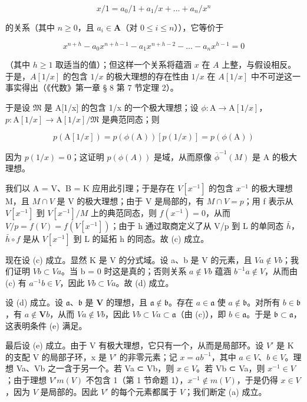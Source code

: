\[
x / 1 = a _ {0} / 1 + a _ {1} / x + \dots + a _ {n} / x ^ {n}
\]

的关系（其中 \(n \geqslant 0\)，且 \(a_{i} \in \mathbf{A}\)（对 \(0 \leqslant i \leqslant n\)）），它等价于

\[
x ^ {n + h} - a _ {0} x ^ {n + h - 1} - a _ {1} x ^ {n + h - 2} - \dots - a _ {n} x ^ {h - 1} = 0
\]

（其中 \(h \geqslant 1\) 取适当的值）；但这样一个关系将蕴涵 \(x\) 在 \(A\) 上整，与假设相反。于是，\(A[1/x]\) 的包含 \(1/x\) 的极大理想的存在性由 \(1/x\) 在 \(A[1/x]\) 中不可逆这一事实得出（《代数》第一章 § 8 第 7 节定理 2）。

于是设 \(\mathfrak{M}\) 是 A{[}1/x{]} 的包含 1/x 的一个极大理想；设 \(\phi: \mathrm{A} \to \mathrm{A}[1/x]\)，\(p: \mathrm{A}[1/x] \to \mathrm{A}[1/x]/\mathfrak{M}\) 是典范同态；则

\[
p (\mathrm{A} [ 1 / x ]) = p (\phi (\mathrm{A})) [ p (1 / x) ] = p (\phi (\mathrm{A}))
\]

因为 \(p(1/x) = 0\)；这证明 \(p(\phi(A))\) 是域，从而原像 \(\overline{\phi}^{-1}(M)\) 是 A 的极大理想。

我们以 A = V、B = K 应用此引理；于是存在 \(V[x^{-1}]\) 的包含 \(x^{-1}\) 的极大理想 M，且 \(M \cap V\) 是 V 的极大理想；由于 V 是局部的，有 \(M \cap V = p\)；用 f 表示从 \(V[x^{-1}]\) 到 \(V[x^{-1}] / M\) 上的典范同态，则 \(f(x^{-1}) = 0\)，从而 \(V / p = f(V) = f(V[x^{-1}])\)；由于 h 通过取商定义了从 V/p 到 L 的单同态 \(\bar{h}\)，\(\bar{h} \circ f\) 是从 \(V[x^{-1}]\) 到 L 的延拓 h 的同态。故 (c) 成立。

现在设 (c) 成立。显然 K 是 V 的分式域。设 a、b 是 V 的元素，且 \(Va \notin Vb\)；我们证明 \(Vb \subset Va\)。当 b = 0 时这是真的；否则关系 \(a \notin Vb\) 蕴涵 \(b^{-1}a \notin V\)，从而由 (c) 有 \(a^{-1}b \in V\)，因此 \(Vb \subset Va\)。故 (d) 成立。

设 (d) 成立。设 \(\mathfrak{a}\)、\(\mathfrak{b}\) 是 \(\mathbf{V}\) 的理想，且 \(\mathfrak{a} \notin \mathfrak{b}\)。存在 \(a \in \mathfrak{a}\) 使 \(a \notin \mathfrak{b}\)。对所有 \(b \in \mathfrak{b}\)，有 \(a \notin \mathbf{V}b\)，从而 \(Va \notin Vb\)，因此 \(Vb \subset Va \subset \mathfrak{a}\)（由 (c)），即 \(b \in \mathfrak{a}\)。于是 \(\mathfrak{b} \subset \mathfrak{a}\)，这表明条件 (e) 满足。

最后设 (e) 成立。由于 V 有极大理想，它只有一个，从而是局部环。设 \(V'\) 是 K 的支配 V 的局部子环，x 是 \(V'\) 的非零元素；记 \(x = ab^{-1}\)，其中 \(a \in V\)、\(b \in V\)。理想 Va、Vb 之一含于另一个。若 Va ⊂ Vb，则 \(x \in V\)。若 Vb ⊂ Va，则 \(x^{-1} \in V\)；由于理想 \(V'm(V)\) 不包含 1（第 1 节命题 1），\(x^{-1} \notin m(V)\)，于是仍得 \(x \in V\)，因为 \(V\) 是局部的。因此 \(V'\) 的每个元素都属于 \(V\)；我们断定 (a) 成立。

